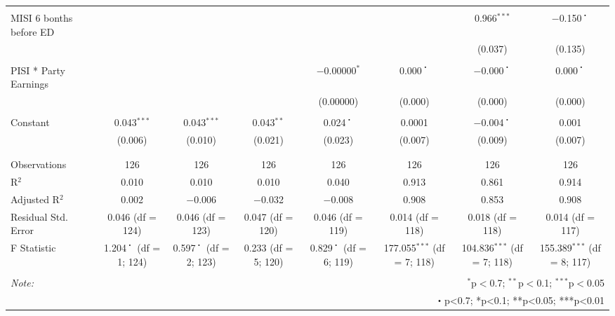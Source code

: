 \begin{tabular}{@{\extracolsep{5pt}}lccccccc}
  & & & & & & & \\ 
 MISI 6 bonths before ED &  &  &  &  &  & 0.966$^{***}$ & $-$0.150$^{・}$ \\ 
  &  &  &  &  &  & (0.037) & (0.135) \\ 
  & & & & & & & \\ 
 PISI * Party Earnings &  &  &  & $-$0.00000$^{*}$ & 0.000$^{・}$ & $-$0.000$^{・}$ & 0.000$^{・}$ \\ 
  &  &  &  & (0.00000) & (0.000) & (0.000) & (0.000) \\ 
  & & & & & & & \\ 
 Constant & 0.043$^{***}$ & 0.043$^{***}$ & 0.043$^{**}$ & 0.024$^{・}$ & 0.0001 & $-$0.004$^{・}$ & 0.001 \\ 
  & (0.006) & (0.010) & (0.021) & (0.023) & (0.007) & (0.009) & (0.007) \\ 
  & & & & & & & \\ 
\hline \\[-1.8ex] 
Observations & 126 & 126 & 126 & 126 & 126 & 126 & 126 \\ 
R$^{2}$ & 0.010 & 0.010 & 0.010 & 0.040 & 0.913 & 0.861 & 0.914 \\ 
Adjusted R$^{2}$ & 0.002 & $-$0.006 & $-$0.032 & $-$0.008 & 0.908 & 0.853 & 0.908 \\ 
Residual Std. Error & 0.046 (df = 124) & 0.046 (df = 123) & 0.047 (df = 120) & 0.046 (df = 119) & 0.014 (df = 118) & 0.018 (df = 118) & 0.014 (df = 117) \\ 
F Statistic & 1.204$^{・}$ (df = 1; 124) & 0.597$^{・}$ (df = 2; 123) & 0.233 (df = 5; 120) & 0.829$^{・}$ (df = 6; 119) & 177.055$^{***}$ (df = 7; 118) & 104.836$^{***}$ (df = 7; 118) & 155.389$^{***}$ (df = 8; 117) \\ 
\hline 
\hline \\[-1.8ex] 
\textit{Note:}  & \multicolumn{7}{r}{$^{*}$p$<$0.7; $^{**}$p$<$0.1; $^{***}$p$<$0.05} \\ 
 & \multicolumn{7}{r}{・p<0.7; *p<0.1; **p<0.05; ***p<0.01} \\ 
\end{tabular} 
